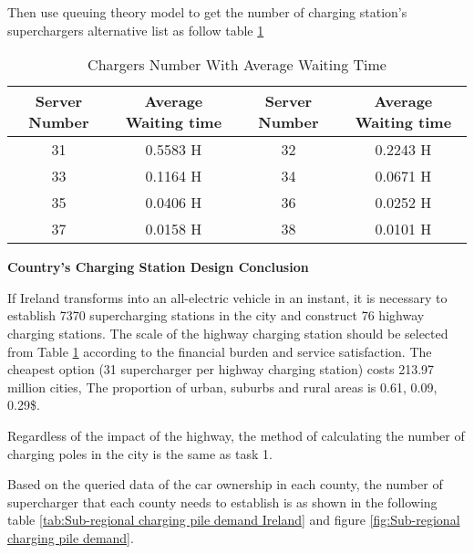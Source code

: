 \documentclass{mcmthesis}
\begin{document}
\par Then use queuing theory model to get the number of charging station's superchargers alternative list as follow table \ref{tab:Charging pile Number With Average Waiting Time Ireland}


\begin{table}[h]
\centering
\caption{Chargers Number With Average Waiting Time}\label{tab:Charging pile Number With Average Waiting Time Ireland}
\begin{tabular}{cc|cc}
\toprule
  Server Number & Average Waiting time &  Server Number & Average Waiting time \\
\midrule
31 & 0.5583 H & 32 & 0.2243 H \\
33 & 0.1164 H & 34 & 0.0671 H \\
35 & 0.0406 H & 36 & 0.0252 H \\
37 & 0.0158 H & 38 & 0.0101 H \\
\bottomrule
\end{tabular}
\end{table}

\textbf{Country's Charging Station Design Conclusion}


\par If Ireland transforms into an all-electric vehicle in an instant, it is necessary to establish 7370 supercharging stations in the city and construct 76 highway charging stations. The scale of the highway charging station should be selected from Table \ref{tab:Charging pile Number With Average Waiting Time Ireland} according to the financial burden and service satisfaction. The cheapest option (31 supercharger per highway charging station) costs 213.97 million cities, The proportion of urban, suburbs and rural areas is 0.61, 0.09, 0.29\$.


\par Regardless of the impact of the highway, the method of calculating the number of charging poles in the city is the same as task 1.
\par Based on the queried data of the car ownership in each county, the number of supercharger that each county needs to establish is as shown in the following table \ref{tab:Sub-regional charging pile demand Ireland} and figure \ref{fig:Sub-regional charging pile demand}.
\end{document}
